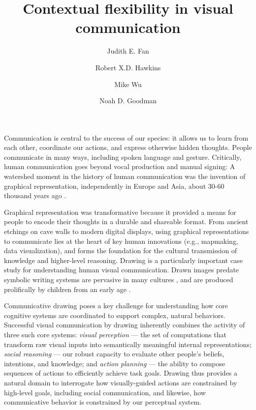 \documentclass[9pt,twocolumn,twoside]{pnas-new}
\title{Contextual flexibility in visual communication}
\author[a,1,*]{Judith E. Fan}
\author[a,*]{Robert X.D. Hawkins}
\author[b]{Mike Wu}
\author[a,b]{Noah D. Goodman}
\affil[a]{Department of Psychology, Stanford University}
\affil[b]{Department of Computer Science, Stanford University}
\affil[*]{These authors contributed equally to this work.}
\begin{document}
\verticaladjustment{-2pt}

\maketitle
\thispagestyle{firststyle}

Communication is central to the success of our species: it allows us to learn from each other, coordinate our actions, and express otherwise hidden thoughts. People communicate in many ways, including spoken language and gesture. Critically, human communication goes beyond vocal production and manual signing: A watershed moment in the history of human communication was the invention of graphical representation, independently in Europe and Asia, about 30-60 thousand years ago \cite{hoffmann2018u,Aubert:2014jy}.

Graphical representation was transformative because it provided a means for people to encode their thoughts in a durable and shareable format. From ancient etchings on cave walls to modern digital displays, using graphical representations to communicate lies at the heart of key human innovations (e.g., mapmaking, data visualization), and forms the foundation for the cultural transmission of knowledge and higher-level reasoning. Drawing is a particularly important case study for understanding human visual communication. Drawn images predate symbolic writing systems \cite{clottes2008cave} are pervasive in many cultures \cite{gombrich1989story}, and are produced prolifically by children from an early age \cite{kellogg1969analyzing}.


Communicative drawing poses a key challenge for understanding how core cognitive systems are coordinated to support complex, natural behaviors. Successful visual communication by drawing inherently combines the activity of three such core systems: \textit{visual perception} --- the set of computations that transform raw visual inputs into semantically meaningful internal representations; \textit{social reasoning} --- our robust capacity to evaluate other people's beliefs, intentions, and knowledge; and \textit{action planning} --- the ability to compose sequences of actions to efficiently achieve task goals. Drawing thus provides a natural domain to interrogate how visually-guided actions are constrained by high-level goals, including social communication, and likewise, how communicative behavior is constrained by our perceptual system.
\end{document}
